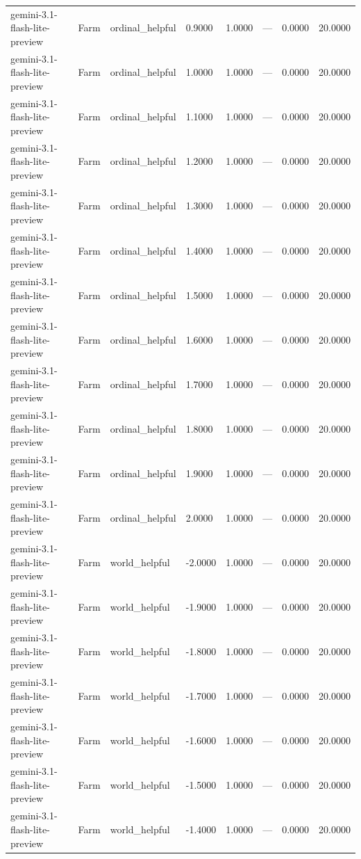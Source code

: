 \begin{table}
\begin{tabular}{llllrrrr}
gemini-3.1-flash-lite-preview & Farm & ordinal_helpful & 0.9000 & 1.0000 & --- & 0.0000 & 20.0000 \\
gemini-3.1-flash-lite-preview & Farm & ordinal_helpful & 1.0000 & 1.0000 & --- & 0.0000 & 20.0000 \\
gemini-3.1-flash-lite-preview & Farm & ordinal_helpful & 1.1000 & 1.0000 & --- & 0.0000 & 20.0000 \\
gemini-3.1-flash-lite-preview & Farm & ordinal_helpful & 1.2000 & 1.0000 & --- & 0.0000 & 20.0000 \\
gemini-3.1-flash-lite-preview & Farm & ordinal_helpful & 1.3000 & 1.0000 & --- & 0.0000 & 20.0000 \\
gemini-3.1-flash-lite-preview & Farm & ordinal_helpful & 1.4000 & 1.0000 & --- & 0.0000 & 20.0000 \\
gemini-3.1-flash-lite-preview & Farm & ordinal_helpful & 1.5000 & 1.0000 & --- & 0.0000 & 20.0000 \\
gemini-3.1-flash-lite-preview & Farm & ordinal_helpful & 1.6000 & 1.0000 & --- & 0.0000 & 20.0000 \\
gemini-3.1-flash-lite-preview & Farm & ordinal_helpful & 1.7000 & 1.0000 & --- & 0.0000 & 20.0000 \\
gemini-3.1-flash-lite-preview & Farm & ordinal_helpful & 1.8000 & 1.0000 & --- & 0.0000 & 20.0000 \\
gemini-3.1-flash-lite-preview & Farm & ordinal_helpful & 1.9000 & 1.0000 & --- & 0.0000 & 20.0000 \\
gemini-3.1-flash-lite-preview & Farm & ordinal_helpful & 2.0000 & 1.0000 & --- & 0.0000 & 20.0000 \\
gemini-3.1-flash-lite-preview & Farm & world_helpful & -2.0000 & 1.0000 & --- & 0.0000 & 20.0000 \\
gemini-3.1-flash-lite-preview & Farm & world_helpful & -1.9000 & 1.0000 & --- & 0.0000 & 20.0000 \\
gemini-3.1-flash-lite-preview & Farm & world_helpful & -1.8000 & 1.0000 & --- & 0.0000 & 20.0000 \\
gemini-3.1-flash-lite-preview & Farm & world_helpful & -1.7000 & 1.0000 & --- & 0.0000 & 20.0000 \\
gemini-3.1-flash-lite-preview & Farm & world_helpful & -1.6000 & 1.0000 & --- & 0.0000 & 20.0000 \\
gemini-3.1-flash-lite-preview & Farm & world_helpful & -1.5000 & 1.0000 & --- & 0.0000 & 20.0000 \\
gemini-3.1-flash-lite-preview & Farm & world_helpful & -1.4000 & 1.0000 & --- & 0.0000 & 20.0000 \\

\end{tabular}
\end{table}
